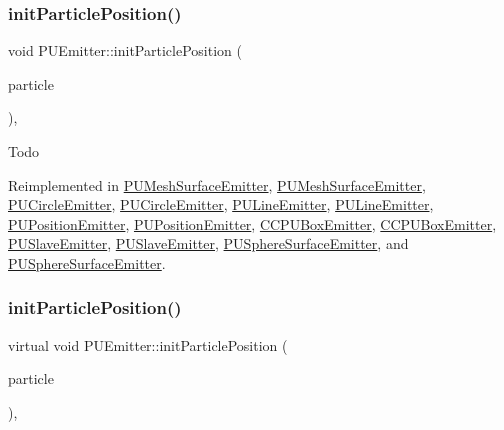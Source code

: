 \subsubsection{\texorpdfstring{init\+Particle\+Position()}{initParticlePosition()}\hspace{0.1cm}{\footnotesize\ttfamily [1/2]}}
{\footnotesize\ttfamily void P\+U\+Emitter\+::init\+Particle\+Position (\begin{DoxyParamCaption}\item[{\hyperlink{structPUParticle3D}{P\+U\+Particle3D} $\ast$}]{particle }\end{DoxyParamCaption})\hspace{0.3cm}{\ttfamily [protected]}, {\ttfamily [virtual]}}

Todo 

Reimplemented in \hyperlink{classPUMeshSurfaceEmitter_a868c19220258dc73548b344edd8f3e18}{P\+U\+Mesh\+Surface\+Emitter}, \hyperlink{classPUMeshSurfaceEmitter_a9696ca685d847e4e3c4f403e66f95ecb}{P\+U\+Mesh\+Surface\+Emitter}, \hyperlink{classPUCircleEmitter_a29bb94b8103ac04b51b65ca4780ce490}{P\+U\+Circle\+Emitter}, \hyperlink{classPUCircleEmitter_ae5f34473b3fc262944ed96489a5ed5ce}{P\+U\+Circle\+Emitter}, \hyperlink{classPULineEmitter_af448c4a0d07befdcdd1d28d7fddacb03}{P\+U\+Line\+Emitter}, \hyperlink{classPULineEmitter_a45329bb73318a8b5c356e7ae3ce0da95}{P\+U\+Line\+Emitter}, \hyperlink{classPUPositionEmitter_a6e2e82f753f3339a4981f3c8d80d1b48}{P\+U\+Position\+Emitter}, \hyperlink{classPUPositionEmitter_ab23517a23c156545d99238298b3ac0c6}{P\+U\+Position\+Emitter}, \hyperlink{classCCPUBoxEmitter_a405d3a333bd6e513a38f1b318163f969}{C\+C\+P\+U\+Box\+Emitter}, \hyperlink{classCCPUBoxEmitter_ad3f50a904d4f27ce0b40d5e9ccfad9c9}{C\+C\+P\+U\+Box\+Emitter}, \hyperlink{classPUSlaveEmitter_a8498d171d9db253b48e103c9946abba3}{P\+U\+Slave\+Emitter}, \hyperlink{classPUSlaveEmitter_a91be8151129e78b9a1a06a67ff67c640}{P\+U\+Slave\+Emitter}, \hyperlink{classPUSphereSurfaceEmitter_a03a5b2d1d21c867c4f22a127555eeb46}{P\+U\+Sphere\+Surface\+Emitter}, and \hyperlink{classPUSphereSurfaceEmitter_aa727aa40576357ab1e2577ae9e47937a}{P\+U\+Sphere\+Surface\+Emitter}.

\mbox{\label{classPUEmitter_a65d85961411e319dbf5d19d455680f3d}} 
\subsubsection{\texorpdfstring{init\+Particle\+Position()}{initParticlePosition()}\hspace{0.1cm}{\footnotesize\ttfamily [2/2]}}
{\footnotesize\ttfamily virtual void P\+U\+Emitter\+::init\+Particle\+Position (\begin{DoxyParamCaption}\item[{\hyperlink{structPUParticle3D}{P\+U\+Particle3D} $\ast$}]{particle }\end{DoxyParamCaption})\hspace{0.3cm}{\ttfamily [protected]}, {\ttfamily [virtual]}}

